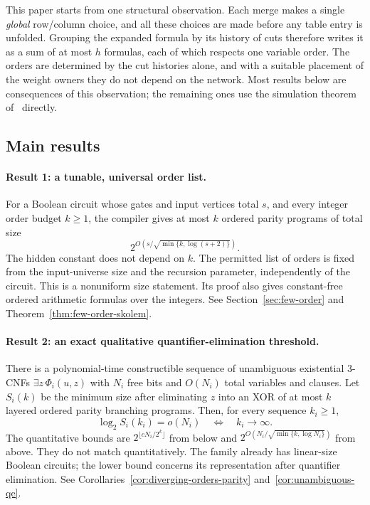 \documentclass[11pt]{article}
\theoremstyle{definition}
\theoremstyle{remark}
\begin{document}
This paper starts from one structural observation. Each merge makes
a single \emph{global} row/column choice, and all these choices are
made before any table entry is unfolded. Grouping the expanded formula
by its history of cuts therefore writes it as a sum of at most $h$
formulas, each of which respects one variable order. The orders are
determined by the cut histories alone, and with a suitable placement
of the weight owners they do not depend on the network. Most results
below are consequences of this observation; the remaining ones use the
simulation theorem of~\cite{Cruz26} directly.

\subsection{Main results}

\paragraph{Result 1: a tunable, universal order list.}
For a Boolean circuit whose gates and input vertices total $s$, and
every integer order budget $k\ge1$, the compiler gives at most $k$
ordered parity programs of total size
\[
  2^{O\!\left(s/\sqrt{\min\{k,\log(s+2)\}}\right)}.
\]
The hidden constant does not depend on $k$. The permitted list of
orders is fixed from the input-universe size and the recursion
parameter, independently of the circuit. This is a nonuniform size
statement. Its proof also gives constant-free ordered arithmetic
formulas over the integers. See Section~\ref{sec:few-order} and
Theorem~\ref{thm:few-order-skolem}.

\paragraph{Result 2: an exact qualitative quantifier-elimination threshold.}
There is a polynomial-time constructible sequence of unambiguous
existential 3-CNFs $\exists z\,\Phi_i(u,z)$ with $N_i$ free bits and
$O(N_i)$ total variables and clauses. Let $S_i(k)$ be the minimum
size after eliminating $z$ into an XOR of at most $k$ layered ordered
parity branching programs. Then, for every sequence $k_i\ge1$,
\[
 \log_2 S_i(k_i)=o(N_i)\quad\Longleftrightarrow\quad k_i\to\infty.
\]
The quantitative bounds are $2^{\lfloor cN_i/2^k\rfloor}$ from below
and $2^{O(N_i/\sqrt{\min\{k,\log N_i\}})}$ from above.
They do not match quantitatively. The family already has linear-size
Boolean circuits; the lower bound concerns its representation after
quantifier elimination. See Corollaries~\ref{cor:diverging-orders-parity}
and~\ref{cor:unambiguous-qe}.
\end{document}
